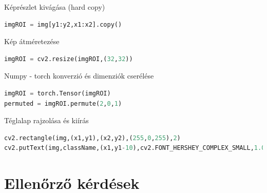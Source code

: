 \documentclass[12pt,a4paper,oneside]{report}             %
\begin{document}
Képrészlet kivágása (hard copy)

\begin{lstlisting}[language=Python]
imgROI = img[y1:y2,x1:x2].copy()
\end{lstlisting}

Kép átméretezése

\begin{lstlisting}[language=Python]
imgROI = cv2.resize(imgROI,(32,32))
\end{lstlisting}

Numpy - torch konverzió és dimenziók cserélése

\begin{lstlisting}[language=Python]
imgROI = torch.Tensor(imgROI)
permuted = imgROI.permute(2,0,1)
\end{lstlisting}

Téglalap rajzolása és kiírás

\begin{lstlisting}[language=Python]
cv2.rectangle(img,(x1,y1),(x2,y2),(255,0,255),2)
cv2.putText(img,className,(x1,y1-10),cv2.FONT_HERSHEY_COMPLEX_SMALL,1.0,(0,255,0))
\end{lstlisting}



\chapter{Ellenőrző kérdések}
\end{document}
